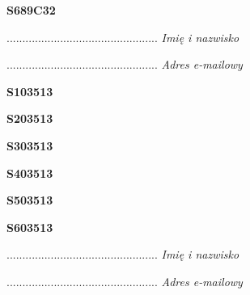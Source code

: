 \begin{turn}{90}\huge \textbf{S689C32}\end{turn}

\begin{turn}{90}\begin{minipage}{\linewidth} \vspace{20mm} ................................................  \textit{Imię i nazwisko}\end{minipage}\end{turn}

\begin{turn}{90}\begin{minipage}{\linewidth} \vspace{20mm} ................................................  \textit{Adres e-mailowy}\end{minipage}\end{turn}

\begin{turn}{90}\huge \textbf{S103513}\end{turn}

\begin{turn}{90}\huge \textbf{S203513}\end{turn}

\begin{turn}{90}\huge \textbf{S303513}\end{turn}

\begin{turn}{90}\huge \textbf{S403513}\end{turn}

\begin{turn}{90}\huge \textbf{S503513}\end{turn}

\begin{turn}{90}\huge \textbf{S603513}\end{turn}

\begin{turn}{90}\begin{minipage}{\linewidth} \vspace{20mm} ................................................  \textit{Imię i nazwisko}\end{minipage}\end{turn}

\begin{turn}{90}\begin{minipage}{\linewidth} \vspace{20mm} ................................................  \textit{Adres e-mailowy}\end{minipage}\end{turn}


